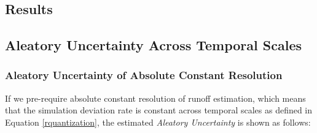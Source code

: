 \documentclass[draft,wrr]{AGUTeX}
\begin{document}
\begin{article}
\section{Results}
\subsection{Aleatory Uncertainty Across Temporal Scales} 

\subsubsection{Aleatory Uncertainty of Absolute Constant Resolution}

If we pre-require absolute constant resolution of runoff estimation, which means that the simulation deviation rate is constant across temporal scales as defined in Equation \eqref{rquantization}, the estimated \emph{Aleatory Uncertainty} is shown as follows:


\end{article}
\end{document}
